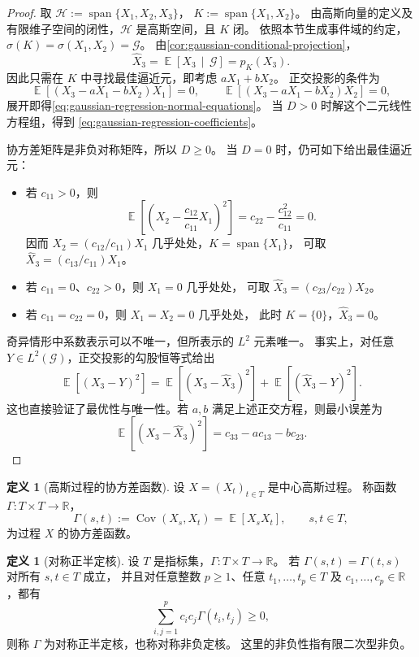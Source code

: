 \documentclass[UTF8,11pt,a4paper,oneside,fontset=fandol]{ctexrep}
\numberwithin{equation}{section}
\theoremstyle{plain}
\theoremstyle{definition}
\newtheorem{definition}[theorem]{定义}
\theoremstyle{remark}
\newcommand{\R}{\mathbb{R}}
\newcommand{\Hcal}{\mathcal{H}}
\DeclareMathOperator{\E}{\mathbb{E}}
\DeclareMathOperator{\Cov}{Cov}
\newcommand{\Econd}[2]{%
  \E\!\left[#1\,\middle|\,#2\right]}
\begin{document}
\begin{proof}
取 $\Hcal:=\operatorname{span}\{X_1,X_2,X_3\}$，
$K:=\operatorname{span}\{X_1,X_2\}$。
由高斯向量的定义及有限维子空间的闭性，$\Hcal$ 是高斯空间，且 $K$ 闭。
依照本节生成事件域的约定，$\sigma(K)=\sigma(X_1,X_2)=\mathcal G$。
由\cref{cor:gaussian-conditional-projection}，
\[
  \widehat X_3=\Econd{X_3}{\mathcal G}=p_K(X_3).
\]
因此只需在 $K$ 中寻找最佳逼近元，即考虑 $aX_1+bX_2$。
正交投影的条件为
\[
  \E[(X_3-aX_1-bX_2)X_1]=0,\qquad
  \E[(X_3-aX_1-bX_2)X_2]=0,
\]
展开即得\cref{eq:gaussian-regression-normal-equations}。
当 $D>0$ 时解这个二元线性方程组，得到
\cref{eq:gaussian-regression-coefficients}。

协方差矩阵是非负对称矩阵，所以 $D\ge0$。
当 $D=0$ 时，仍可如下给出最佳逼近元：
\begin{itemize}
  \item 若 $c_{11}>0$，则
    \[
      \E\!\left[\left(X_2-\frac{c_{12}}{c_{11}}X_1\right)^2\right]
      =c_{22}-\frac{c_{12}^2}{c_{11}}=0.
    \]
    因而 $X_2=(c_{12}/c_{11})X_1$ 几乎处处，$K=\operatorname{span}\{X_1\}$，
    可取 $\widehat X_3=(c_{13}/c_{11})X_1$。
  \item 若 $c_{11}=0$、$c_{22}>0$，则 $X_1=0$ 几乎处处，
    可取 $\widehat X_3=(c_{23}/c_{22})X_2$。
  \item 若 $c_{11}=c_{22}=0$，则 $X_1=X_2=0$ 几乎处处，
    此时 $K=\{0\}$，$\widehat X_3=0$。
\end{itemize}
奇异情形中系数表示可以不唯一，但所表示的 $L^2$ 元素唯一。
事实上，对任意 $Y\in L^2(\mathcal G)$，正交投影的勾股恒等式给出
\[
  \E[(X_3-Y)^2]
  =\E[(X_3-\widehat X_3)^2]+\E[(\widehat X_3-Y)^2].
\]
这也直接验证了最优性与唯一性。若 $a,b$ 满足上述正交方程，则最小误差为
\[
  \E[(X_3-\widehat X_3)^2]=c_{33}-a c_{13}-b c_{23}.
\]
\end{proof}

\begin{definition}[高斯过程的协方差函数]
\label{def:gaussian-process-covariance}
设 $X=(X_t)_{t\in T}$ 是中心高斯过程。
称函数 $\Gamma:T\times T\to\R$，
\[
  \Gamma(s,t):=\Cov(X_s,X_t)=\E[X_sX_t],\qquad s,t\in T,
\]
为过程 $X$ 的协方差函数。
\end{definition}

\begin{definition}[对称正半定核]
\label{def:symmetric-positive-kernel}
设 $T$ 是指标集，$\Gamma:T\times T\to\R$。
若 $\Gamma(s,t)=\Gamma(t,s)$ 对所有 $s,t\in T$ 成立，
并且对任意整数 $p\ge1$、任意 $t_1,\ldots,t_p\in T$ 及
$c_1,\ldots,c_p\in\R$，都有
\[
  \sum_{i,j=1}^{p}c_i c_j\Gamma(t_i,t_j)\ge0,
\]
则称 $\Gamma$ 为对称正半定核，也称对称非负定核。
这里的非负性指有限二次型非负。
\end{definition}
\end{document}
